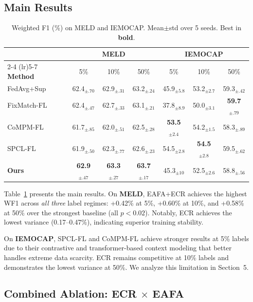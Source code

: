 \documentclass[letterpaper]{article}
\begin{document}
\subsection{Main Results}

\begin{table}[t]
\centering
\caption{Weighted F1 (\%) on MELD and IEMOCAP. Mean$\pm$std over 5 seeds.
Best in \textbf{bold}.}
\label{tab:main}
\setlength{\tabcolsep}{2pt}
\begin{tabular}{l ccc ccc}
\toprule
& \multicolumn{3}{c}{\textbf{MELD}} & \multicolumn{3}{c}{\textbf{IEMOCAP}} \\
\cmidrule(lr){2-4} \cmidrule(lr){5-7}
\textbf{Method} & 5\% & 10\% & 50\% & 5\% & 10\% & 50\% \\
\midrule
FedAvg+Sup & 62.4$_{\pm.70}$ & 62.9$_{\pm.31}$ & 63.2$_{\pm.24}$
           & 45.9$_{\pm5.8}$ & 53.2$_{\pm2.7}$ & 59.3$_{\pm.42}$ \\
FixMatch-FL & 62.4$_{\pm.47}$ & 62.7$_{\pm.33}$ & 63.1$_{\pm.21}$
            & 37.8$_{\pm8.9}$ & 50.0$_{\pm3.1}$ & \textbf{59.7}$_{\pm.79}$ \\
CoMPM-FL & 61.7$_{\pm.85}$ & 62.0$_{\pm.51}$ & 62.5$_{\pm.28}$
         & \textbf{53.5}$_{\pm2.4}$ & 54.2$_{\pm1.5}$ & 58.3$_{\pm.89}$ \\
SPCL-FL & 61.9$_{\pm.50}$ & 62.3$_{\pm.77}$ & 62.6$_{\pm.23}$
        & 54.5$_{\pm2.8}$ & \textbf{54.5}$_{\pm2.8}$ & 59.5$_{\pm.62}$ \\
\midrule
\textbf{Ours} & \textbf{62.9}$_{\pm.47}$ & \textbf{63.3}$_{\pm.27}$ & \textbf{63.7}$_{\pm.17}$
              & 45.3$_{\pm10}$ & 52.5$_{\pm2.6}$ & 58.8$_{\pm.56}$ \\
\bottomrule
\end{tabular}
\end{table}

Table~\ref{tab:main} presents the main results. On \textbf{MELD}, EAFA+ECR
achieves the highest WF1 across \textit{all three} label regimes: +0.42\% at
5\%, +0.60\% at 10\%, and +0.58\% at 50\% over the strongest baseline (all
$p < 0.02$). Notably, ECR achieves the lowest variance (0.17--0.47\%),
indicating superior training stability.

On \textbf{IEMOCAP}, SPCL-FL and CoMPM-FL achieve stronger results at 5\% labels
due to their contrastive and transformer-based context modeling that better handles
extreme data scarcity. ECR remains competitive at 10\% labels and demonstrates
the lowest variance at 50\%. We analyze this limitation in Section~5.

\subsection{Combined Ablation: ECR $\times$ EAFA}
\end{document}
